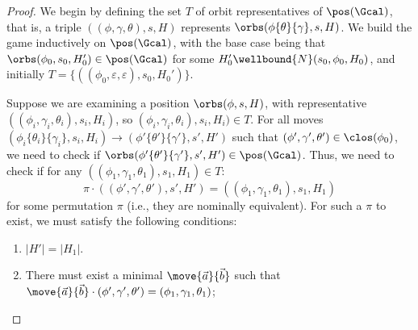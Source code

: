 \begin{proof}
	We begin by defining the set $T$ of orbit representatives of $\pos(\Gcal)$, that is, a triple $((\phi, \gamma, \theta), s, H)$ represents $\orbs(\phi\{\theta\}\{\gamma\}, s, H)$.
	We build the game inductively on $\pos(\Gcal)$, with the base case being that $\orbs(\phi_0, s_0, H_0') \in \pos(\Gcal)$ for some $H_0'\wellbound{N}(s_0,\phi_0,H_0)$, and initially $T = \{((\phi_0, \varepsilon, \varepsilon), s_0, H_0')\}$.
	
	Suppose we are examining a position $\orbs( \phi,  s,  H)$, 
	with representative $((\phi_i, \gamma_i, \theta_i), s_i, H_i)$, so $(\phi_i, \gamma_i, \theta_i), s_i, H_i) \in T$. 
	For all moves $(\phi_i\{\theta_i\}\{\gamma_i\}, s_i, H_i) \to (\phi'\{\theta'\}\{\gamma'\}, s', H')$ such that $(\phi', \gamma', \theta') \in \clos(\phi_0)$, we need to check if $\orbs(\phi'\{\theta'\}\{\gamma'\}, s', H') \in \pos(\Gcal)$. 
	Thus, we need to check if for any $((\phi_1, \gamma_1, \theta_1), s_1, H_1) \in T$:
	$$\pi \cdot ((\phi', \gamma', \theta'), s', H') = ((\phi_1, \gamma_1, \theta_1), s_1, H_1)$$ 
	for some permutation $\pi$ (i.e., they are nominally equivalent).
	For such a $\pi$ to exist, we must satisfy the following conditions:
	\begin{enumerate}
		\item $|H'| = |H_1|$.
		\item There must exist a minimal $\move{\vec a}{\vec b}$ such that $\move{\vec a}{\vec b} \cdot (\phi', \gamma', \theta') = (\phi_1, \gamma_1, \theta_1)$; 

\end{enumerate}
\end{proof}
